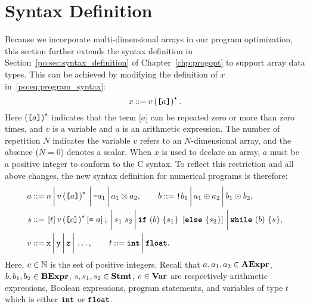\section{Syntax Definition}
\label{lo:sec:syntax_definition}

Because we incorporate multi-dimensional arrays in our program
optimization, this section further extends the syntax definition in
Section~\ref{po:sec:syntax_definition} of Chapter~\ref{chp:progopt} to support
array data types.  This can be achieved by modifying the definition of $x$
in~\eqref{po:eq:program_syntax}:
\begin{equation}
    x \mathbin{::=} v \left( \texttt{[$a$]} \right)^\star.
\end{equation}
Here $\left( \texttt{[$a$]} \right)^\star$ indicates that the term $\texttt{[} a
\texttt{]}$ can be repeated zero or more than zero times, and $v$ is a variable
and $a$ is an arithmetic expression.  The number of repetition $N$ indicates
the variable $v$ refers to an $N$-dimensional array, and the absence ($N = 0$)
denotes a scalar.  When $x$ is used to declare an array, $a$ must be a positive
integer to conform to the C syntax.  To reflect this restriction and all above
changes, the new syntax definition for numerical programs is therefore:
\begin{equation}
    \begin{aligned}
        a \mathbin{::=} {} &
            n \,\bigg|\,
            v \left( \texttt{[$a$]} \right)^\star \,\bigg|\,
            \texttt{-}a_1 \,\bigg|\,
            a_1 \otimes a_2, \qquad
        b \mathbin{::=}
            \texttt{!}b_1 \,\bigg|\,
            a_1 \oplus a_2 \,\bigg|\,
            b_1 \odot b_2, \\
        s \mathbin{::=} {} &
            \left[ t \right] v \left( \texttt{[$c$]} \right)^\star
                \left[ \texttt{=}~a \right] \mathbin{;} \,\bigg|\,
            s_1~s_2 \,\bigg|\,
            \texttt{\textbf{if}}~(b)~\{ s_1 \}~\left[\texttt{\textbf{else}}~\{ s_2 \}\right] \,\bigg|\,
            \texttt{\textbf{while}}~(b)~\{s\}, \\
        v \mathbin{::=} {} & \texttt{x} \,\bigg|\, \texttt{y} \,\bigg|\, \texttt{z} \,\bigg|\, \mathellipsis,
            \qquad
        t \mathbin{::=} \texttt{\textbf{int}} \,\bigg|\, \texttt{\textbf{float}}.
    \end{aligned}
    \label{lo:eq:program_syntax}
\end{equation}
Here, $c \in \mathbb{N}$ is the set of positive integers.  Recall that
$a, a_1, a_2 \in \mathbf{AExpr}$, $b, b_1, b_2 \in \mathbf{BExpr}$, $s, s_1, s_2 \in
\mathbf{Stmt}$, $v \in \mathbf{Var}$ are respectively arithmetic expressions, Boolean
expressions, program statements, and variables of type $t$ which is either
$\texttt{\textbf{int}}$ or $\texttt{\textbf{float}}$.
